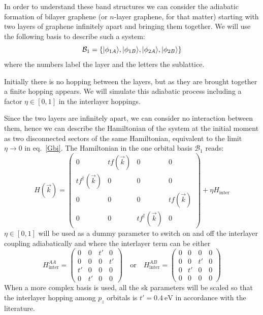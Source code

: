In order to understand these band structures we can consider the adiabatic formation of bilayer graphene (or $n$-layer graphene, for that matter) starting with two layers of graphene infinitely apart and bringing them together.
We will use the following basis to describe such a system:
\begin{equation}
  \mathcal{B}_1 = \left\{|\phi_{1A}\rangle, |\phi_{1B}\rangle,
                        |\phi_{2A}\rangle, |\phi_{2B}\rangle\right\}
\label{basis_bi}
\end{equation}
where the numbers label the layer and the letters the sublattice.
\bigskip

Initially there is no hopping between the layers, but as they are brought together a finite hopping appears. We will simulate this adiabatic process including a factor $\eta\in[0,1]$ in the interlayer hoppings.


Since the two layers are infinitely apart, we can consider no interaction between them, hence we can describe the Hamiltonian of the system at the initial moment as two disconnected sectors of the same Hamiltonian, equivalent to the limit $\eta\rightarrow0$ in eq.~\eqref{Gbi}. The Hamiltonian in the one orbital basis $\mathcal{B}_1$ reads:
\begin{equation}
   H(\vec{k}) = \left(\begin{array}{cc|cc}
     0 & tf(\vec{k}) & 0 & 0 \\
     tf^{\dagger}(\vec{k}) & 0 & 0 & 0 \\ \hline
     0 & 0 & 0 & tf(\vec{k}) \\
     0 & 0 & tf^{\dagger}(\vec{k}) & 0
  \end{array}\right) +
  \eta H_\text{inter}
\label{Gbi}
\end{equation}
$\eta\in[0,1]$ will be used as a dummy parameter to switch on and off the interlayer coupling adiabatically and where the interlayer term can be either
\begin{equation}
H^{AA}_\text{inter}=\left(\begin{array}{cc|cc}
                          0  & 0  & t' & 0 \\
                          0  & 0  & 0  & t'\\ \hline
                          t' & 0  & 0  & 0 \\
                          0  & t' & 0  & 0\end{array}\right)
\quad\text{or}\quad
H^{AB}_\text{inter}=\left(\begin{array}{c|cc|c}
                          0 & 0  & 0  & 0 \\ \hline
                          0 & 0  & t' & 0 \\
                          0 & t' & 0  & 0 \\ \hline
                          0 & 0  & 0  & 0\end{array}\right)
\end{equation}
When a more complex basis is used, all the \ac{sk} parameters will be scaled so that the interlayer hopping among $p_z$ orbitals is $t'=\SI{0.4}{\eV}$ in accordance with the literature\cite{KatsnelsonBook}.

